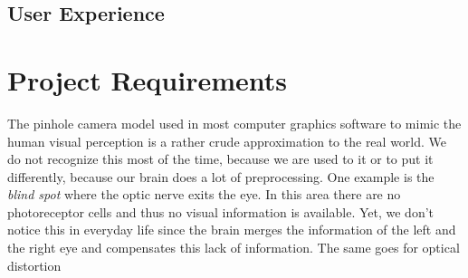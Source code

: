\documentclass{acm_proc_article-sp}
\begin{document}
\subsection{User Experience}

\section{Project Requirements}
The pinhole camera model used in most computer graphics software to mimic
the human visual perception is a rather crude approximation to the real world.
We do not recognize this most of the time, because we are used to it or to
put it differently, because our brain does a lot of preprocessing.
One example is the \emph{blind spot} where the optic nerve exits the eye.
In this area there are no photoreceptor cells and thus no visual information is
available. Yet, we don't notice this in everyday life since the brain merges
the information of the left and the right eye and compensates this lack of
information. The same goes for optical distortion
\end{document}
